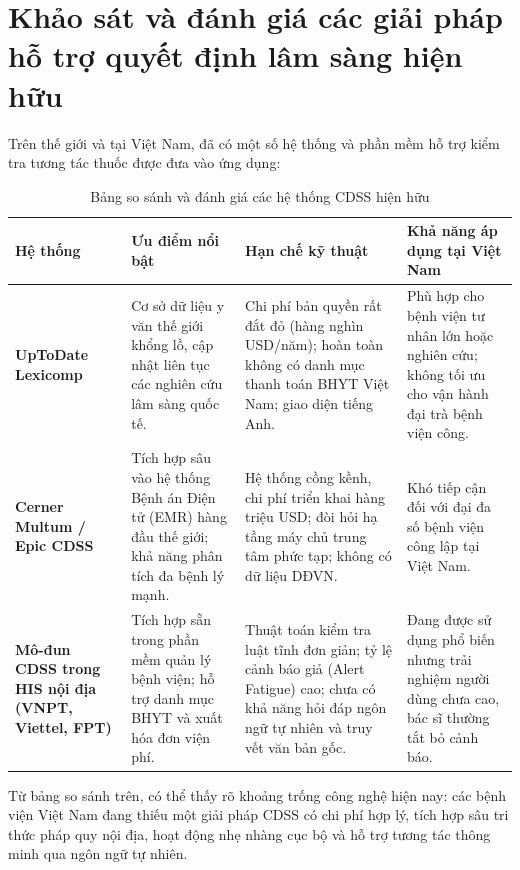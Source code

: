 \section{Khảo sát và đánh giá các giải pháp hỗ trợ quyết định lâm sàng hiện hữu}
\label{sec:existing_solutions}

Trên thế giới và tại Việt Nam, đã có một số hệ thống và phần mềm hỗ trợ kiểm tra tương tác thuốc được đưa vào ứng dụng:

\begin{table}[htbp]
\centering
\small
\begin{tabularx}{\textwidth}{L{3.0cm} L{3.5cm} L{3.5cm} Y}
\toprule
\textbf{Hệ thống} & \textbf{Ưu điểm nổi bật} & \textbf{Hạn chế kỹ thuật} & \textbf{Khả năng áp dụng tại Việt Nam} \\
\midrule
\textbf{UpToDate Lexicomp} & Cơ sở dữ liệu y văn thế giới khổng lồ, cập nhật liên tục các nghiên cứu lâm sàng quốc tế. & Chi phí bản quyền rất đắt đỏ (hàng nghìn USD/năm); hoàn toàn không có danh mục thanh toán BHYT Việt Nam; giao diện tiếng Anh. & Phù hợp cho bệnh viện tư nhân lớn hoặc nghiên cứu; không tối ưu cho vận hành đại trà bệnh viện công. \\
\addlinespace
\textbf{Cerner Multum / Epic CDSS} & Tích hợp sâu vào hệ thống Bệnh án Điện tử (EMR) hàng đầu thế giới; khả năng phân tích đa bệnh lý mạnh. & Hệ thống cồng kềnh, chi phí triển khai hàng triệu USD; đòi hỏi hạ tầng máy chủ trung tâm phức tạp; không có dữ liệu DĐVN. & Khó tiếp cận đối với đại đa số bệnh viện công lập tại Việt Nam. \\
\addlinespace
\textbf{Mô-đun CDSS trong HIS nội địa (VNPT, Viettel, FPT)} & Tích hợp sẵn trong phần mềm quản lý bệnh viện; hỗ trợ danh mục BHYT và xuất hóa đơn viện phí. & Thuật toán kiểm tra luật tĩnh đơn giản; tỷ lệ cảnh báo giả (Alert Fatigue) cao; chưa có khả năng hỏi đáp ngôn ngữ tự nhiên và truy vết văn bản gốc. & Đang được sử dụng phổ biến nhưng trải nghiệm người dùng chưa cao, bác sĩ thường tắt bỏ cảnh báo. \\
\bottomrule
\end{tabularx}
\caption{Bảng so sánh và đánh giá các hệ thống CDSS hiện hữu}
\end{table}

Từ bảng so sánh trên, có thể thấy rõ khoảng trống công nghệ hiện nay: các bệnh viện Việt Nam đang thiếu một giải pháp CDSS có chi phí hợp lý, tích hợp sâu tri thức pháp quy nội địa, hoạt động nhẹ nhàng cục bộ và hỗ trợ tương tác thông minh qua ngôn ngữ tự nhiên.
